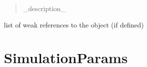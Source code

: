 \documentclass[letterpaper,10pt,english]{sphinxmanual}
\begin{document}
\begin{fulllineitems}
\begin{fulllineitems}
\begin{quote}
\begin{description}
\begin{itemize}
\end{itemize}

\sphinxAtStartPar
{} \textendash{} \_description\_

\end{description}\end{quote}

\end{fulllineitems}


\begin{fulllineitems}
\label{\detokenize{index:raypyng.simulate.Simulate.__weakref__}}
\pysigstartsignatures
{}
\pysigstopsignatures
\sphinxAtStartPar
list of weak references to the object (if defined)

\end{fulllineitems}


\end{fulllineitems}



\chapter{SimulationParams}
\label{\detokenize{index:simulationparams}}
\end{document}
